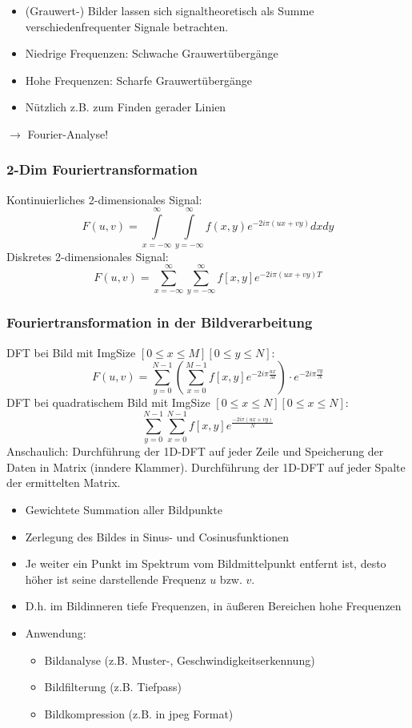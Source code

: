 \begin{itemize}
\item (Grauwert-) Bilder lassen sich signaltheoretisch als Summe verschiedenfrequenter Signale betrachten.
\item Niedrige Frequenzen: Schwache Grauwertübergänge
\item Hohe Frequenzen: Scharfe Grauwertübergänge
\item Nützlich z.B. zum Finden gerader Linien
\end{itemize}
$\to$ Fourier-Analyse!

\subsubsection*{2-Dim Fouriertransformation}

Kontinuierliches 2-dimensionales Signal: $$F(u,v) = \int\limits_{x = - \infty}^{\infty} \int\limits_{y = - \infty}^{\infty} f(x,y) e^{-2i\pi (ux + vy)} dxdy$$
Diskretes 2-dimensionales Signal: $$F(u,v) = \sum\limits_{x = - \infty}^{\infty} \sum\limits_{y = - \infty}^{\infty} f[x,y] e^{-2i\pi (ux + vy)T}$$

\subsubsection*{Fouriertransformation in der Bildverarbeitung}

DFT bei Bild mit ImgSize $[0 \leq x \leq M][0 \leq y \leq N]$: $$F(u,v) = \sum\limits_{y=0}^{N-1} \left( \sum\limits_{x=0}^{M-1} f[x,y] e^{-2i\pi \frac{ux}{M}} \right) \cdot e^{-2i\pi \frac{vy}{N}}$$
DFT bei quadratischem Bild mit ImgSize $[0 \leq x \leq N][0 \leq x \leq N]$: $$\sum\limits_{y=0}^{N-1} \sum\limits_{x=0}^{N-1} f[x,y] e^{\frac{-2i\pi (ux + vy)}{N}}$$
Anschaulich: Durchführung der 1D-DFT auf jeder Zeile und Speicherung der Daten in Matrix (inndere Klammer). Durchführung der 1D-DFT auf jeder Spalte der ermittelten Matrix.

\begin{itemize}
\item Gewichtete Summation aller Bildpunkte
\item Zerlegung des Bildes in Sinus- und Cosinusfunktionen
\item Je weiter ein Punkt im Spektrum vom Bildmittelpunkt entfernt ist, desto höher ist seine darstellende Frequenz $u$ bzw. $v$.
\item D.h. im Bildinneren tiefe Frequenzen, in äußeren Bereichen hohe Frequenzen
\item Anwendung:
\begin{itemize}
\item Bildanalyse (z.B. Muster-, Geschwindigkeitserkennung)
\item Bildfilterung (z.B. Tiefpass)
\item Bildkompression (z.B. in jpeg Format)
\end{itemize}
\end{itemize}

